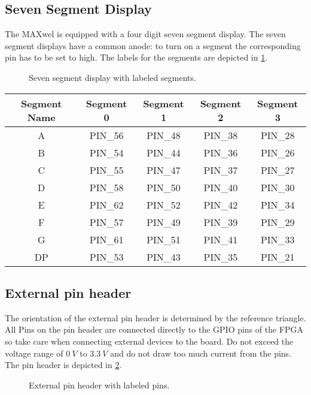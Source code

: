 \subsection{Seven Segment Display}
The MAXwel is equipped with a four digit seven segment display.
The seven segment displays have a common anode: to turn on a segment the corresponding pin has to be set to high.
The labels for the segments are depicted in \cref{fig:seven_segment_display}.

\begin{figure}[h!]
    \centering
    
    \caption{Seven segment display with labeled segments.}
    \label{fig:seven_segment_display}
\end{figure}

\begin{center}
	\begin{tabular}{c c c c c}
		Segment Name & Segment 0 & Segment 1 & Segment 2 & Segment 3 \\
		\hline
		A & PIN\_56 & PIN\_48 & PIN\_38 & PIN\_28 \\
		B & PIN\_54 & PIN\_44 & PIN\_36 & PIN\_26 \\
		C & PIN\_55 & PIN\_47 & PIN\_37 & PIN\_27 \\
		D & PIN\_58 & PIN\_50 & PIN\_40 & PIN\_30 \\
		E & PIN\_62 & PIN\_52 & PIN\_42 & PIN\_34 \\
		F & PIN\_57 & PIN\_49 & PIN\_39 & PIN\_29 \\
		G & PIN\_61 & PIN\_51 & PIN\_41 & PIN\_33 \\
		DP & PIN\_53 & PIN\_43 & PIN\_35 & PIN\_21 \\
		\hline
	\end{tabular}
\end{center}

\subsection{External pin header}
The orientation of the external pin header is determined by the reference triangle.
All Pins on the pin header are connected directly to the GPIO pins of the FPGA so take care when connecting external devices to the board.
Do not exceed the voltage range of $\SI{0}{V}$ to $\SI{3.3}{V}$ and do not draw too much current from the pins.
The pin header is depicted in \cref{fig:external_pin_header}.

\begin{figure}[h!]
    \centering
    
    \caption{External pin header with labeled pins.}
    \label{fig:external_pin_header}
\end{figure}

